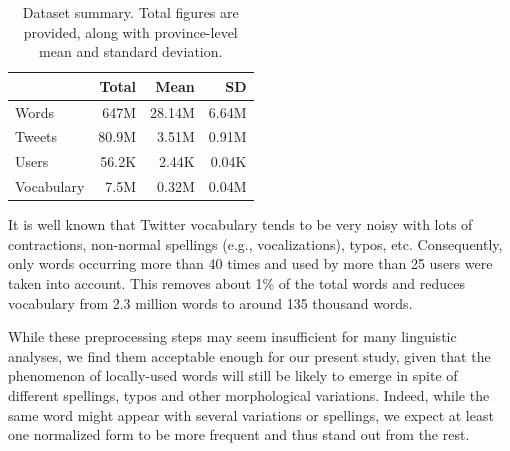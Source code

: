 \begin{table}[b]
\begin{center}

\begin{tabular}{lrrr}
            & Total   & Mean   & SD \\ %
\hline 
Words       &  647M   &  28.14M & 6.64M  \\ %
Tweets      &  80.9M  &  3.51M  & 0.91M  \\ %
Users       &  56.2K  &  2.44K  & 0.04K  \\ %
Vocabulary  &   7.5M  &  0.32M  & 0.04M  \\ %
\hline
\end{tabular}


\caption{Dataset summary. Total figures are provided, along with province-level mean and standard deviation.}
\label{tab:summary_tweets}
\end{center}
\end{table}


It is well known that Twitter vocabulary tends to be very noisy \cite{kaufmann2010syntactic} with lots of contractions, non-normal spellings (e.g., vocalizations), typos, etc. Consequently, only words occurring more than 40 times and used by more than 25 users were taken into account. This removes about 1\% of the total words and reduces vocabulary from 2.3 million words to around 135 thousand words. 

While these preprocessing steps may seem insufficient for many linguistic analyses, we find them acceptable enough for our present study, given that the phenomenon of locally-used words will still be likely to emerge in spite of different spellings, typos and other morphological variations. Indeed, while the same word might appear with several variations or spellings, we expect at least one normalized form to be more frequent and thus stand out from the rest.







